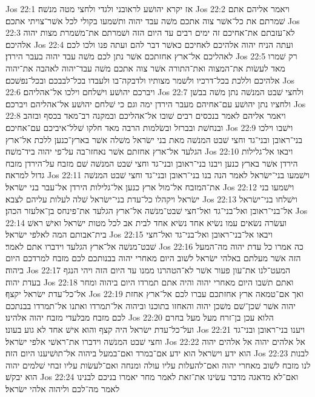 Jos 22:1  אז יקרא יהושׁע לראובני ולגדי ולחצי מטה מנשׁה׃
Jos 22:2  ויאמר אליהם אתם שׁמרתם את כל־אשׁר צוה אתכם משׁה עבד יהוה ותשׁמעו בקולי לכל אשׁר־צויתי אתכם׃
Jos 22:3  לא־עזבתם את־אחיכם זה ימים רבים עד היום הזה ושׁמרתם את־משׁמרת מצות יהוה אלהיכם׃
Jos 22:4  ועתה הניח יהוה אלהיכם לאחיכם כאשׁר דבר להם ועתה פנו ולכו לכם לאהליכם אל־ארץ אחזתכם אשׁר נתן לכם משׁה עבד יהוה בעבר הירדן׃
Jos 22:5  רק שׁמרו מאד לעשׂות את־המצוה ואת־התורה אשׁר צוה אתכם משׁה עבד־יהוה לאהבה את־יהוה אלהיכם וללכת בכל־דרכיו ולשׁמר מצותיו ולדבקה־בו ולעבדו בכל־לבבכם ובכל־נפשׁכם׃
Jos 22:6  ויברכם יהושׁע וישׁלחם וילכו אל־אהליהם׃
Jos 22:7  ולחצי שׁבט המנשׁה נתן משׁה בבשׁן ולחציו נתן יהושׁע עם־אחיהם מעבר הירדן ימה וגם כי שׁלחם יהושׁע אל־אהליהם ויברכם׃
Jos 22:8  ויאמר אליהם לאמר בנכסים רבים שׁובו אל־אהליכם ובמקנה רב־מאד בכסף ובזהב ובנחשׁת ובברזל ובשׂלמות הרבה מאד חלקו שׁלל־איביכם עם־אחיכם׃
Jos 22:9  וישׁבו וילכו בני־ראובן ובני־גד וחצי שׁבט המנשׁה מאת בני ישׂראל משׁלה אשׁר בארץ־כנען ללכת אל־ארץ הגלעד אל־ארץ אחזתם אשׁר נאחזו־בה על־פי יהוה ביד־משׁה׃
Jos 22:10  ויבאו אל־גלילות הירדן אשׁר בארץ כנען ויבנו בני־ראובן ובני־גד וחצי שׁבט המנשׁה שׁם מזבח על־הירדן מזבח גדול למראה׃
Jos 22:11  וישׁמעו בני־ישׂראל לאמר הנה בנו בני־ראובן ובני־גד וחצי שׁבט המנשׁה את־המזבח אל־מול ארץ כנען אל־גלילות הירדן אל־עבר בני ישׂראל׃
Jos 22:12  וישׁמעו בני ישׂראל ויקהלו כל־עדת בני־ישׂראל שׁלה לעלות עליהם לצבא׃
Jos 22:13  וישׁלחו בני־ישׂראל אל־בני־ראובן ואל־בני־גד ואל־חצי שׁבט־מנשׁה אל־ארץ הגלעד את־פינחס בן־אלעזר הכהן׃
Jos 22:14  ועשׂרה נשׂאים עמו נשׂיא אחד נשׂיא אחד לבית אב לכל מטות ישׂראל ואישׁ ראשׁ בית־אבותם המה לאלפי ישׂראל׃
Jos 22:15  ויבאו אל־בני־ראובן ואל־בני־גד ואל־חצי שׁבט־מנשׁה אל־ארץ הגלעד וידברו אתם לאמר׃
Jos 22:16  כה אמרו כל עדת יהוה מה־המעל הזה אשׁר מעלתם באלהי ישׂראל לשׁוב היום מאחרי יהוה בבנותכם לכם מזבח למרדכם היום ביהוה׃
Jos 22:17  המעט־לנו את־עון פעור אשׁר לא־הטהרנו ממנו עד היום הזה ויהי הנגף בעדת יהוה׃
Jos 22:18  ואתם תשׁבו היום מאחרי יהוה והיה אתם תמרדו היום ביהוה ומחר אל־כל־עדת ישׂראל יקצף׃
Jos 22:19  ואך אם־טמאה ארץ אחזתכם עברו לכם אל־ארץ אחזת יהוה אשׁר שׁכן־שׁם משׁכן יהוה והאחזו בתוכנו וביהוה אל־תמרדו ואתנו אל־תמרדו בבנתכם לכם מזבח מבלעדי מזבח יהוה אלהינו׃
Jos 22:20  הלוא עכן בן־זרח מעל מעל בחרם ועל־כל־עדת ישׂראל היה קצף והוא אישׁ אחד לא גוע בעונו׃
Jos 22:21  ויענו בני־ראובן ובני־גד וחצי שׁבט המנשׁה וידברו את־ראשׁי אלפי ישׂראל׃
Jos 22:22  אל אלהים יהוה אל אלהים יהוה הוא ידע וישׂראל הוא ידע אם־במרד ואם־במעל ביהוה אל־תושׁיענו היום הזה׃
Jos 22:23  לבנות לנו מזבח לשׁוב מאחרי יהוה ואם־להעלות עליו עולה ומנחה ואם־לעשׂות עליו זבחי שׁלמים יהוה הוא יבקשׁ׃
Jos 22:24  ואם־לא מדאגה מדבר עשׂינו את־זאת לאמר מחר יאמרו בניכם לבנינו לאמר מה־לכם וליהוה אלהי ישׂראל׃

